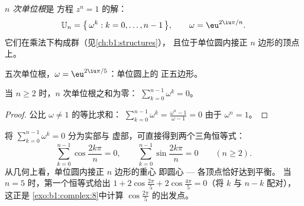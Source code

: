 \begin{definition}[单位根]\label{def:b1:complex:unity}
\emph{$n$ 次单位根}是
方程 $z^n = 1$ 的解：
\[
\mathbb{U}_n = \bigl\{\, \omega^k : k = 0, \dots, n-1 \,\bigr\},
\qquad \omega = \eu^{2\iu\pi/n}.
\]
它们在乘法下构成群（见\cref{ch:b1:structures}），
且位于单位圆内接正 $n$ 边形的顶点上。
\end{definition}

\begin{omfigure}

{\small 五次单位根，$\omega = \eu^{2\iu\pi/5}$：单位圆上的
正五边形。}
\end{omfigure}

\begin{proposition}[单位根之和]\label{prop:b1:complex:sumroots}
当 $n \geq 2$ 时，$n$ 次单位根之和为零：
$\sum_{k=0}^{n-1} \omega^k = 0$。
\end{proposition}

\begin{proof}
公比 $\omega \neq 1$ 的等比求和：
$\sum_{k=0}^{n-1} \omega^k = \frac{\omega^n - 1}{\omega - 1} = 0$
由于 $\omega^n = 1$。
\end{proof}

\begin{example}[读取实部与虚部]\label{ex:b1:complex:sumrootsparts}
将 $\sum_{k=0}^{n-1}\omega^k = 0$ 分为实部与
虚部，可直接得到两个三角恒等式：
\[
\sum_{k=0}^{n-1}\cos\frac{2k\pi}n = 0,
\qquad
\sum_{k=0}^{n-1}\sin\frac{2k\pi}n = 0
\qquad (n \geq 2).
\]
从几何上看，单位圆内接正 $n$ 边形的重心
即圆心 --- 各顶点恰好达到平衡。
当 $n = 5$ 时，第一个恒等式给出 $1 + 2\cos\frac{2\pi}5 +
2\cos\frac{4\pi}5 = 0$（将 $k$ 与 $n - k$ 配对），这正是
\cref{exo:b1:complex:8}中计算
$\cos\frac{2\pi}5$ 的出发点。
\end{example}

